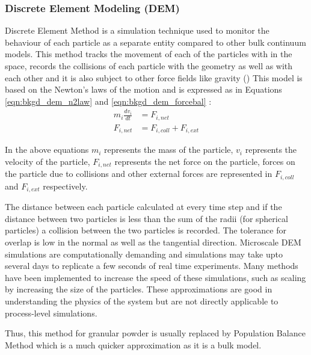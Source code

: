 \documentclass[preprint,11pt,authoryear]{elsarticle}
\begin{document}
\subsubsection{Discrete Element Modeling (DEM)}
\par Discrete Element Method is a simulation technique used to monitor the behaviour of each particle as a separate entity compared to other bulk continuum models. This method tracks the movement of each of the particles with in the space, records the collisions of each particle with the geometry as well as with each other and it is also subject to other force fields like gravity (\cite{Barrasso2015cerd})  This model is based on the Newton's laws of the motion and is expressed as in Equations \ref{eqn:bkgd_dem_n2law} and  \ref{eqn:bkgd_dem_forcebal} : \\
\begin{align}
m_i\frac{dv_i}{dt} &= F_{i,net} \label{eqn:bkgd_dem_n2law} \\
F_{i,net} &=  F_{i,coll} +  F_{i,ext} \label{eqn:bkgd_dem_forcebal}
\end{align}
\par  In the above equations $m_i$ represents the mass of the particle, $v_i$ represents the velocity of the particle, $F_{i,net}$  represents the net force on the particle, forces on the particle due to collisions and other external forces are represented in $F_{i,coll}$ and $F_{i,ext}$ respectively.
\par The distance between each particle calculated at every time step and if the distance between two particles is less than the sum of the radii (for spherical particles)  a collision between the two particles is recorded. The tolerance for overlap is low in the normal as well as the tangential direction. Microscale DEM simulations are computationally demanding and simulations may take upto several days to replicate a few seconds of real time experiments. Many methods have been implemented to increase the speed of these simulations, such as scaling by increasing the size of the particles. These approximations are good in understanding the physics of the system but are not directly applicable to process-level simulations. 
\par Thus, this method for granular powder is usually replaced by Population Balance Method which is a much quicker approximation as it is a bulk model.  
\end{document}
